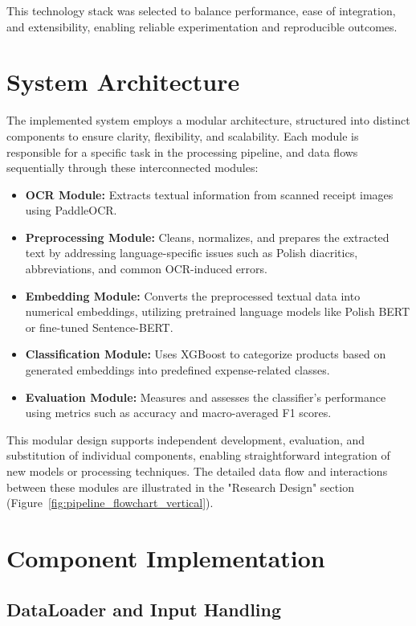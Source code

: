\documentclass{SGGW-thesis-EN}
\begin{document}
This technology stack was selected to balance performance, ease of integration, and extensibility, enabling reliable experimentation and reproducible outcomes.

\section{System Architecture}

The implemented system employs a modular architecture, structured into distinct components to ensure clarity, flexibility, and scalability.  
Each module is responsible for a specific task in the processing pipeline, and data flows sequentially through these interconnected modules:

\begin{itemize}
    \item \textbf{OCR Module:} Extracts textual information from scanned receipt images using PaddleOCR.
    \item \textbf{Preprocessing Module:} Cleans, normalizes, and prepares the extracted text by addressing language-specific issues such as Polish diacritics, abbreviations, and common OCR-induced errors.
    \item \textbf{Embedding Module:} Converts the preprocessed textual data into numerical embeddings, utilizing pretrained language models like Polish BERT or fine-tuned Sentence-BERT.
    \item \textbf{Classification Module:} Uses XGBoost to categorize products based on generated embeddings into predefined expense-related classes.
    \item \textbf{Evaluation Module:} Measures and assesses the classifier’s performance using metrics such as accuracy and macro-averaged F1 scores.
\end{itemize}

This modular design supports independent development, evaluation, and substitution of individual components, enabling straightforward integration of new models or processing techniques. The detailed data flow and interactions between these modules are illustrated in the "Research Design" section (Figure~\ref{fig:pipeline_flowchart_vertical}).

\section{Component Implementation}

\subsection{DataLoader and Input Handling}
\end{document}

